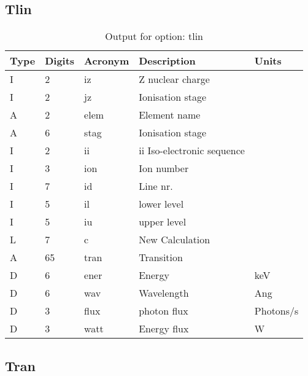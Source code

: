 \subsection{Tlin}

\begin{table}[!p]
\caption{Output for option: tlin}
\label{tabout:tlin}
\begin{tabular}{lllll}
\hline
Type & Digits & Acronym & Description & Units \\ 
\hline
I &  2 & iz   & Z nuclear charge                 &                  \\
I &  2 & jz   & Ionisation stage                 &                  \\
A &  2 & elem & Element name                     &                  \\
A &  6 & stag & Ionisation stage                 &                  \\
I &  2 & ii   & ii Iso-electronic sequence       &                  \\
I &  3 & ion  & Ion number                       &                  \\
I &  7 & id   & Line nr.                         &                  \\
I &  5 & il   & lower level                      &                  \\
I &  5 & iu   & upper level                      &                  \\
L &  7 & c    & New Calculation                  &                  \\
A & 65 & tran & Transition                       &                  \\
D &  6 & ener & Energy                           & keV              \\
D &  6 & wav  & Wavelength                       & Ang              \\
D &  3 & flux & photon flux                      & Photons/s        \\
D &  3 & watt & Energy flux                      & W                \\
\hline
\end{tabular}
\end{table}

\subsection{Tran}

